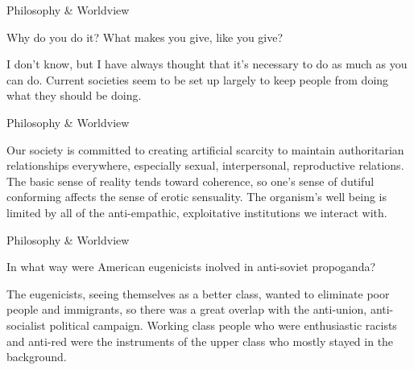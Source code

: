 \documentclass[11pt,oneside,openany,extrafontsizes]{memoir}
\begin{document}
\begin{qaexchange}{Philosophy \& Worldview}

    \begin{question}
         Why do you do it? What makes you give, like you give? 
    \end{question}

    \begin{answer}
       I don't know, but I have always thought that it's necessary to do as much as you can do. Current societies seem to be set up largely to keep people from doing what they should be doing. 
    \end{answer}
\end{qaexchange}

\begin{standalonequote}{Philosophy \& Worldview}

    \begin{answer}
      Our society is committed to creating artificial scarcity to maintain authoritarian relationships everywhere, especially sexual, interpersonal, reproductive relations. The basic sense of reality tends toward coherence, so one's sense of dutiful conforming affects the sense of erotic sensuality. The organism's well being is limited by all of the anti-empathic, exploitative institutions we interact with.
    \end{answer}
\end{standalonequote}

\begin{qaexchange}{Philosophy \& Worldview}

    \begin{question}
         In what way were American eugenicists inolved in anti-soviet propoganda?
    \end{question}

    \begin{answer}
      The eugenicists, seeing themselves as a better class, wanted to eliminate poor people and immigrants, so there was a great overlap with the anti-union, anti-socialist political campaign. Working class people who were enthusiastic racists and anti-red were the instruments of the upper class who mostly stayed in the background.
    \end{answer}
\end{qaexchange}
\end{document}
